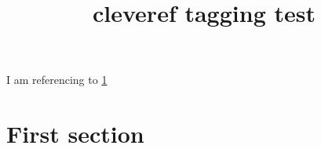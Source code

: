 \documentclass[a4paper,10pt]{article}
\title{cleveref tagging test}
\begin{document}
I am referencing to \cref{target}

\section{First section}
\label{target}
\end{document}

